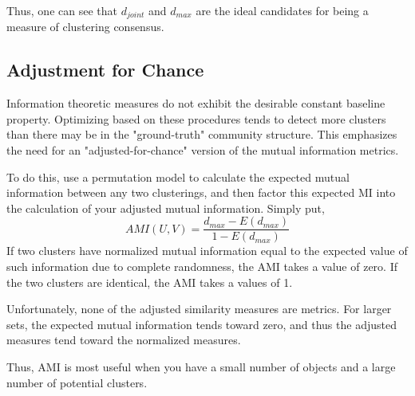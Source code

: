 \documentclass{article}
\begin{document}
Thus, one can see that $d_{joint}$ and $d_{max}$ are the ideal candidates for being a measure of clustering consensus.

\subsection{Adjustment for Chance}

Information theoretic measures do not exhibit the desirable constant baseline property. Optimizing based on these procedures tends to detect more clusters than there may be in the "ground-truth" community structure. This emphasizes the need for an "adjusted-for-chance" version of the mutual information metrics.

To do this, use a permutation model to calculate the expected mutual information between any two clusterings, and then factor this expected MI into the calculation of your adjusted mutual information. Simply put, $$AMI(U,V) = \frac{d_{max} - E(d_{max})}{1-E(d_{max})}$$
If two clusters have normalized mutual information equal to the expected value of such information due to complete randomness, the AMI takes a value of zero. If the two clusters are identical, the AMI takes a values of 1. 

Unfortunately, none of the adjusted similarity measures are metrics. For larger sets, the expected mutual information tends toward zero, and thus the adjusted measures tend toward the normalized measures.

Thus, AMI is most useful when you have a small number of objects and a large number of potential clusters.
\end{document}
